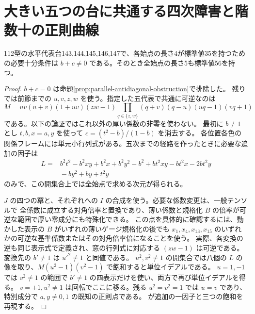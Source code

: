 \section{大きい五つの台に共通する四次障害と階数十の正則曲線}
\label{sec:horizontal-rectangle-low-fibers}
\begin{theorem}\label{thm:horizontal-rectangle-low-fibers}
112型の水平代表台143,144,145,146,147で、各始点の長さ4が標準値35を持つための必要十分条件は
$b+c\ne0$ である。そのとき全始点の長さ5も標準値56を持つ。
\end{theorem}
\begin{proof}
$b+c=0$ は命題\ref{prop:parallel-antidiagonal-obstruction}で排除した。
残りでは前節までの $u,v,z,w$ を使う。指定した五代表で共通に可逆なのは
\[
 M=uv(u+v)(1+uv)(zw-1)\prod_{q\in\{z,w\}}(q+v)(q-u)(uq-1)(vq+1)
\]
である。以下の論証ではこれ以外の厚い係数の非零を使わない。
最初に $b\ne1$ とし $t,b,x=a,y$ を使って $c=(t^2-b)/(1-b)$ を消去する。
各位置各色の関係フレームには単元小行列式がある。五次までの経路を作ったときに必要な追加の因子は
\[
\begin{split}
 L={}&b^2t^2-b^2xy+b^2x+b^2y^2-b^2+b t^2xy-b t^2x-2bt^2y\\
 &{}-by^2+by+t^2y
\end{split}
\]
のみで、この開集合上では全始点で求める次元が得られる。

$J$ の四つの冪と、それぞれへの $I$ の合成を使う。必要な係数変更は、一般テンソルで
全係数に成立する対角倍率と置換であり、薄い係数と規格化 $B$ の倍率が可逆な範囲で厚い零成分にも特殊化できる。
この点を具体的に確認するには、動かした表示の $B$ がいずれの薄いゲージ規格化の後でも
$x_1,x_4,x_{13},x_{15}$ のいずれかの可逆な基準係数またはその対角倍率倍になることを使う。
実際、各変換の逆も同じ表示式で定義され、窓の行列式に対応する $(zw-1)$ は可逆である。
変換先の $b'\ne1$ は $u'^2\ne1$ と同値である。
$u^2,v^2\ne1$ の開集合では八個の $L$ の像を取り、$M(u^2-1)(v^2-1)$ で飽和すると単位イデアルである。
$u=1,-1$ では $v^2\ne1$ の範囲で $b'\ne1$ の四表示だけを使い、両方で再び単位イデアルを得る。
$v=\pm1,u^2\ne1$ は回転でここに移る。残る $u^2=v^2=1$ では $u=v$ であり、
特別成分で $a,y\ne0,1$ の既知の正則点である。
 が追加の一因子と三つの飽和を再現する。
\end{proof}

